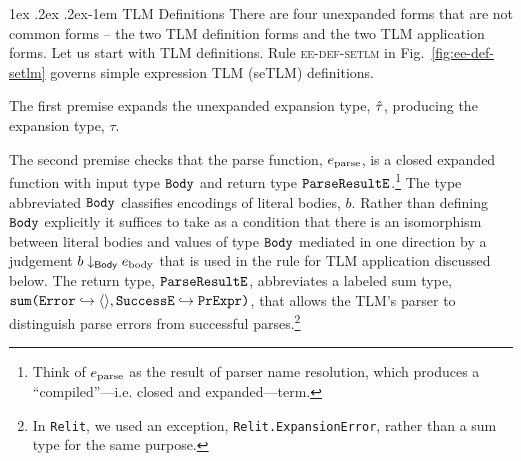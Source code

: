 \documentclass[acmsmall,screen]{acmart}
\makeatletter
\renewcommand{\subsubsection}{%
  \@startsection{subsubsection}{3}%
  {\z@}{1ex \@plus .2ex \@minus .2ex}{-1em}%
  {\sffamily\normalsize\itshape\maybe@addperiod}%
}
\newcommand{\maybe@addperiod}[1]{%
  #1\@addpunct{.}%
}
\newcommand{\lifootnote}[1]{\lstinline[basicstyle=\ttfamily\fontsize{7pt}{1em}\selectfont]{#1}}
\makeatother
\begin{document}
\subsubsection{TLM Definitions}\label{sec:U-uetsm-definition}\label{sec:s-TLM-def}
 There are four unexpanded forms that are not common forms -- the two TLM definition forms and the two TLM application forms. Let us start with TLM definitions. Rule \textsc{ee-def-setlm} in Fig.~\ref{fig:ee-def-setlm} governs simple expression TLM (seTLM) definitions. %

 The first premise expands the unexpanded expansion type, $\utau$, producing the expansion type, $\tau$. 

 The second premise checks that the parse function, $\eparse$, is a closed expanded function with input type $\tBody$ and return type $\tParseResultExp$.\footnote{Think of $\eparse$ as the result of parser name resolution, which produces a ``compiled''---i.e. closed and expanded---term.}
 The type abbreviated $\tBody$ classifies encodings of literal bodies, $b$. Rather than defining $\tBody$ explicitly it suffices to take as a condition that there is an isomorphism between literal bodies and values of type $\tBody$ mediated in one direction by a judgement $\encodeBody{b}{\ebody}$ that is used in the rule for TLM application discussed below. The return type, $\tParseResultExp$, abbreviates a labeled sum type, 
{$
  \asum{~}{\mapitem{\lbltxt{Error}}{\prodt{}}, 
  \mapitem{\lbltxt{SuccessE}}{\tCEExp}}
$}, that allows the TLM's parser to distinguish parse errors from successful parses.\footnote{In \lifootnote{Relit}, we used an exception, \lifootnote{Relit.ExpansionError}, rather than a sum type for the same purpose.}
\end{document}
